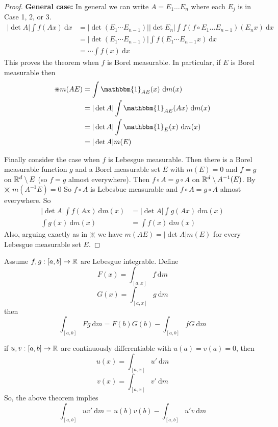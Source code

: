 \begin{proof}
  \textbf{General case:} In general we can write $A = E_1\dotsc E_n$ where each $E_j$ is in Case 1, 2, or 3.
  \begin{align*}
    |\det A| \int f(Ax) \ \mathrm{d}x &= |\det (E_1 \dotsm E_{n-1})||\det E_n| \int f(f\circ E_1\dotsc E_{n-1})(E_n x) \ \mathrm{d}x  \\
    &= |\det (E_1 \dotsm E_{n-1})| \int f(E_1 \dotsm E_{n-1} x) \ \mathrm{d}x \\
    &= \dotsm \int f(x)\ \mathrm{d}x
  \end{align*}
  This proves the theorem when $f$ is Borel measurable. In particular, if $E$ is Borel measurable then
  \begin{align*}
    \divideontimes m(AE) &= \int \mathbbm{1}_{AE}(x) \ \mathrm{d}m(x)  \\
    &= |\det A| \int \mathbbm{1}_{AE}(Ax) \ \mathrm{d}m(x) \\
    &= |\det A| \int \mathbbm{1}_E(x) \ \mathrm{d}m(x) \\
    &= |\det A| m(E)
  \end{align*}

  Finally consider the case when $f$ is Lebesgue measurable.
  Then there is a Borel measurable function $g$ and a Borel measurable set $E$ with $m(E) = 0$
  and $f = g$ on $\mathbb R^d \setminus E$ (so $f = g$ almost everywhere).
  Then $f \circ A = g\circ A$ on $\mathbb R^d \setminus A^{-1}(E)$. By $\divideontimes$ $m(A^{-1}E) = 0$
  So $f \circ A$ is Lebesbue measurable and $f\circ A = g \circ A$ almost everywhere. So
  \begin{align*}
    |\det A| \int f(Ax) \ \mathrm{d}m(x) &= |\det A| \int g(Ax) \ \mathrm{d}m(x) \\
    \int g(x) \ \mathrm{d}m(x) &= \int f(x) \ \mathrm{d}m(x)
  \end{align*}
  Also, arguing exactly as in $\divideontimes$ we have $m(AE) = |\det A| m(E)$ for every Lebesgue measurable set $E$.
\end{proof}

\begin{theorem}
  Assume $f, g : [a, b] \to \mathbb R$ are Lebesgue integrable. 
  Define
  \[F(x) = \int_{[a, x]} f \ \mathrm{d}m\]
  \[G(x) = \int_{[a, x]} g \ \mathrm{d}m\]
  then 
  \[\int_{[a, b]} Fg \ \mathrm{d}m = F(b)G(b) - \int_{[a, b]} fG \ \mathrm{d}m\]
\end{theorem}
\begin{remark}
  if $u, v: [a, b] \to \mathbb R$ are continuously differentiable with $u(a) = v(a) = 0$, then 
  \[u(x) =\int_{[a, x]} u' \ \mathrm{d}m\]
  \[v(x) =\int_{[a, x]} v' \ \mathrm{d}m\]
  So, the above theorem implies 
  \[\int_{[a, b]}uv' \ \mathrm{d}m = u(b)v(b) - \int_{[a, b]} u'v \ \mathrm{d}m\]
\end{remark}

